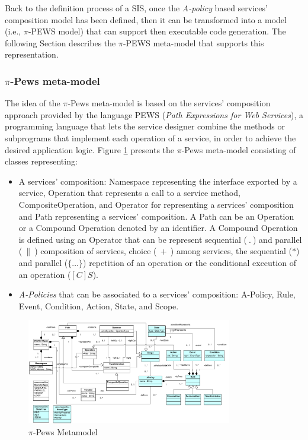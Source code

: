 Back to the  definition process of a SIS, once the {\em A-policy} based services' composition model has been defined, then it can be transformed into a model (i.e., $\pi$-PEWS model) that can support then executable code generation. The following Section describes the $\pi$-PEWS  meta-model that supports this representation. 


\subsubsection{$\pi$-{\sc Pews}  meta-model}\label{sec:pewsmetamodel}
The idea of the $\pi$-{\sc Pews} meta-model is based on the services' composition approach provided by the language PEWS\cite{BaAM06,Placido2010LTPD} (\textit{Path Expressions for Web Services}), a programming language that lets the service designer  combine the methods or subprograms that
implement each operation of a service, in order to achieve the desired application logic. Figure \ref{fig:metamodel} presents the $\pi$-{\sc Pews} meta-model
consisting of  classes representing:
\begin{itemize}
\item A services' composition: {\sc Namespace} representing the interface exported by a service, {\sc Operation} that represents a call to a service method, {\sc CompositeOperation}, and  {\sc Operator} for representing a services' composition and {\sc Path} representing a services' composition.
A {\sc Path} can be an {\sc Operation} or a {\sc Compound Operation}
denoted by an identifier. A {\sc Compound Operation} is defined using an  {\sc Operator}  that can be represent  sequential ($\ . \ $) and parallel ($\ \| \ $) composition of services,
 choice ($\ + \ $) among services,
the sequential ($*$) and parallel ($\{\dots\}$) repetition of an operation or the conditional execution of an operation ($[C]S$).

\item {\em A-Policies} that can be associated to a services' composition:  {\sc A-Policy}, {\sc Rule}, {\sc Event}, {\sc Condition}, {\sc Action}, {\sc State}, and {\sc Scope}.
\end{itemize}
%
\begin{figure}
\centering
\includegraphics[width=0.80\textwidth]{figs/PEWSMetamodel}
\caption{$\pi$-{\sc Pews} Metamodel}
\label{fig:metamodel}
\end{figure}

